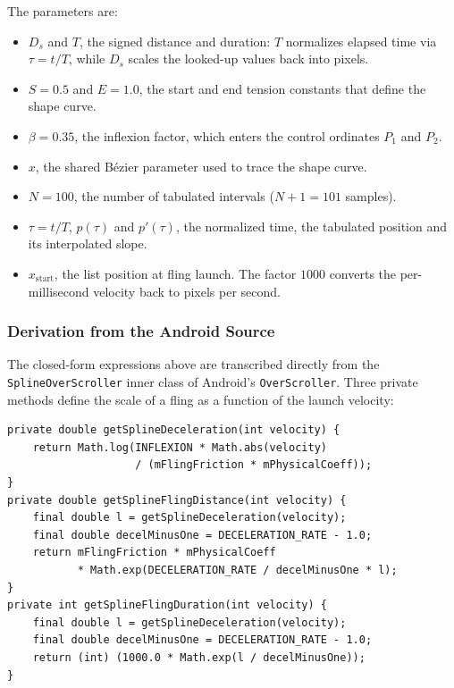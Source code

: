 The parameters are:
\begin{itemize}
  \item $D_s$ and $T$, the signed distance and duration: $T$ normalizes elapsed time via $\tau = t/T$, while $D_s$ scales the looked-up values back into pixels.
  \item $S = 0.5$ and $E = 1.0$, the start and end tension constants that define the shape curve.
  \item $\beta = 0.35$, the inflexion factor, which enters the control ordinates $P_1$ and $P_2$.
  \item $x$, the shared B\'ezier parameter used to trace the shape curve.
  \item $N = 100$, the number of tabulated intervals ($N+1 = 101$ samples).
  \item $\tau = t/T$, $p(\tau)$ and $p'(\tau)$, the normalized time, the tabulated position and its interpolated slope.
  \item $x_{\text{start}}$, the list position at fling launch. The factor $1000$ converts the per-millisecond velocity back to pixels per second.
\end{itemize}

\subsubsection{Derivation from the Android Source}

The closed-form expressions above are transcribed directly from the \texttt{SplineOverScroller} inner class of Android's \texttt{OverScroller}. Three private methods define the scale of a fling as a function of the launch velocity:

\begin{verbatim}
private double getSplineDeceleration(int velocity) {
    return Math.log(INFLEXION * Math.abs(velocity)
                    / (mFlingFriction * mPhysicalCoeff));
}
private double getSplineFlingDistance(int velocity) {
    final double l = getSplineDeceleration(velocity);
    final double decelMinusOne = DECELERATION_RATE - 1.0;
    return mFlingFriction * mPhysicalCoeff
           * Math.exp(DECELERATION_RATE / decelMinusOne * l);
}
private int getSplineFlingDuration(int velocity) {
    final double l = getSplineDeceleration(velocity);
    final double decelMinusOne = DECELERATION_RATE - 1.0;
    return (int) (1000.0 * Math.exp(l / decelMinusOne));
}
\end{verbatim}

